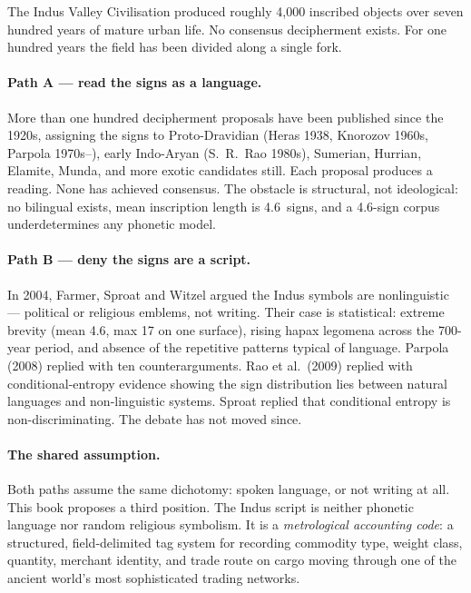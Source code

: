 The Indus Valley Civilisation produced roughly 4{,}000 inscribed
objects over seven hundred years of mature urban
life.\smartcite{Mahadevan1977}
No consensus decipherment exists.
For one hundred years the field has been divided along a single
fork.

\paragraph{Path A --- read the signs as a language.}
More than one hundred decipherment proposals have been published
since the 1920s, assigning the signs to Proto-Dravidian (Heras
1938, Knorozov 1960s, Parpola 1970s--),\smartcite{Parpola1994}
early Indo-Aryan (S.~R.\ Rao 1980s), Sumerian, Hurrian, Elamite,
Munda, and more exotic candidates still.
Each proposal produces a reading.
None has achieved consensus.
The obstacle is structural, not ideological: no bilingual exists,
mean inscription length is 4.6~signs, and a 4.6-sign corpus
underdetermines any phonetic model.

\paragraph{Path B --- deny the signs are a script.}
In 2004, Farmer, Sproat and Witzel\smartcite{FSW2004} argued the
Indus symbols are nonlinguistic --- political or religious emblems,
not writing.
Their case is statistical: extreme brevity (mean 4.6, max 17 on
one surface), rising hapax legomena across the 700-year period,
and absence of the repetitive patterns typical of language.
Parpola (2008) replied with ten counterarguments.\smartcite{Parpola2008}
Rao et al.\ (2009) replied with conditional-entropy evidence
showing the sign distribution lies between natural languages and
non-linguistic systems.\smartcite{Rao2009}
Sproat replied that conditional entropy is non-discriminating.
The debate has not moved since.

\paragraph{The shared assumption.}
Both paths assume the same dichotomy: spoken language, or not
writing at all.
This book proposes a third position.
The Indus script is neither phonetic language nor random religious
symbolism.
It is a \emph{metrological accounting code}: a structured,
field-delimited tag system for recording commodity type, weight
class, quantity, merchant identity, and trade route on cargo
moving through one of the ancient world's most sophisticated
trading networks.


